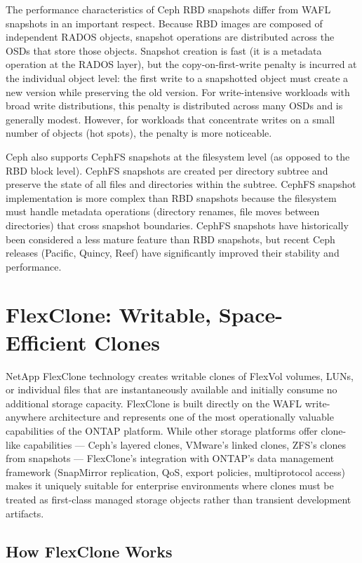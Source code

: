 The performance characteristics of Ceph RBD snapshots differ from WAFL snapshots in an important respect. Because RBD images are composed of independent RADOS objects, snapshot operations are distributed across the OSDs that store those objects. Snapshot creation is fast (it is a metadata operation at the RADOS layer), but the copy-on-first-write penalty is incurred at the individual object level: the first write to a snapshotted object must create a new version while preserving the old version. For write-intensive workloads with broad write distributions, this penalty is distributed across many OSDs and is generally modest. However, for workloads that concentrate writes on a small number of objects (hot spots), the penalty is more noticeable.

Ceph also supports CephFS snapshots at the filesystem level (as opposed to the RBD block level). CephFS snapshots are created per directory subtree and preserve the state of all files and directories within the subtree. CephFS snapshot implementation is more complex than RBD snapshots because the filesystem must handle metadata operations (directory renames, file moves between directories) that cross snapshot boundaries. CephFS snapshots have historically been considered a less mature feature than RBD snapshots, but recent Ceph releases (Pacific, Quincy, Reef) have significantly improved their stability and performance.

\section{FlexClone: Writable, Space-Efficient Clones}

NetApp FlexClone technology creates writable clones of FlexVol volumes, LUNs, or individual files that are instantaneously available and initially consume no additional storage capacity. FlexClone is built directly on the WAFL write-anywhere architecture and represents one of the most operationally valuable capabilities of the ONTAP platform. While other storage platforms offer clone-like capabilities --- Ceph's layered clones, VMware's linked clones, ZFS's clones from snapshots --- FlexClone's integration with ONTAP's data management framework (SnapMirror replication, QoS, export policies, multiprotocol access) makes it uniquely suitable for enterprise environments where clones must be treated as first-class managed storage objects rather than transient development artifacts.

\subsection{How FlexClone Works}

